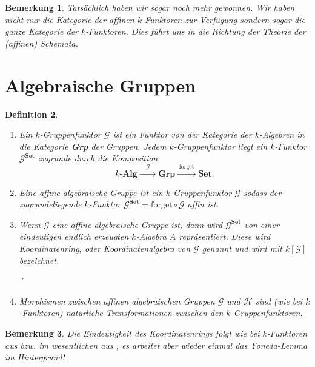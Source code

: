 \documentclass[a4paper, 11pt]{scrartcl}
\theoremstyle{basicstyle}
\newtheorem{definition}{Definition}[section]
\newtheorem{bemerkung}[definition]{Bemerkung}
\begin{document}
    \begin{bemerkung}
        Tatsächlich haben wir sogar noch mehr gewonnen.
        Wir haben nicht nur die Kategorie der affinen \(k\)-Funktoren zur Verfügung sondern sogar die ganze Kategorie der \(k\)-Funktoren.
        Dies führt uns in die Richtung der Theorie der (affinen) Schemata.
    \end{bemerkung}
    

    \section{Algebraische Gruppen}

    \begin{definition}
        \begin{enumerate}
            \item Ein \emph{\(k\)-Gruppenfunktor} \(\mathcal{G}\) ist ein Funktor von der Kategorie der \(k\)-Algebren in die Kategorie \textbf{Grp} der Gruppen.
                Jedem \(k\)-Gruppenfunktor liegt ein \(k\)-Funktor \(\mathcal{G}^{\textbf{Set}}\) zugrunde durch die Komposition
                \[k\textbf{-Alg} \xrightarrow{\quad \mathcal{G} \quad} \textbf{Grp} \xrightarrow{\;\text{forget}\;} \textbf{Set}.\]

            \item Eine \emph{affine algebraische Gruppe} ist ein \(k\)-Gruppenfunktor \(\mathcal{G}\) sodass der zugrundeliegende \(k\)-Funktor \(\mathcal{G}^{\textbf{Set}} = \text{forget} \circ \mathcal{G}\) affin ist.
            
            \item Wenn \(\mathcal{G}\) eine affine algebraische Gruppe ist, dann wird \(\mathcal{G}^{\textbf{Set}}\) von einer eindeutigen endlich erzeugten \(k\)-Algebra \(A\) repräsentiert.
                Diese wird \emph{Koordinatenring}, oder \emph{Koordinatenalgebra} von \(\mathcal{G}\) genannt und wird mit \(k[\mathcal{G}]\) bezeichnet.

´            \item Morphismen zwischen affinen algebraischen Gruppen \(\mathcal{G}\) und \(\mathcal{H}\) sind (wie bei \(k\)-Funktoren) natürliche Transformationen zwischen den \(k\)-Gruppenfunktoren.
        \end{enumerate}
    \end{definition}

    \begin{bemerkung}
        Die Eindeutigkeit des Koordinatenrings folgt wie bei \(k\)-Funktoren aus  bzw. im wesentlichen aus , es arbeitet aber wieder einmal das Yoneda-Lemma im Hintergrund!
    \end{bemerkung}
\end{document}
